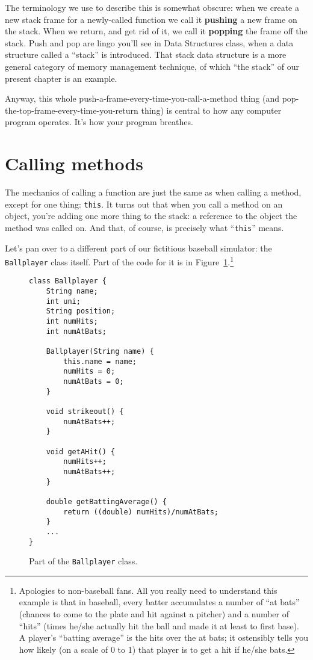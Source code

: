 The terminology we use to describe this is somewhat obscure: when we create a
new stack frame for a newly-called function we call it \textbf{pushing} a new
frame on the stack. When we return, and get rid of it, we call it
\textbf{popping} the frame off the stack. Push and pop are lingo you'll see in
Data Structures class, when a data structure called a ``stack'' is introduced.
That stack data structure is a more general category of memory management
technique, of which ``the stack'' of our present chapter is an example.

Anyway, this whole push-a-frame-every-time-you-call-a-method thing (and
pop-the-top-frame-every-time-you-return thing) is central to how any computer
program operates. It's how your program breathes.


\section{Calling methods}

The mechanics of calling a function are just the same as when calling a
method, except for one thing: \texttt{this}. It turns out that when you call a
method on an object, you're adding one more thing to the stack: a reference to
the object the method was called on. And that, of course, is precisely what
``\texttt{this}'' means.

Let's pan over to a different part of our fictitious baseball simulator: the
\texttt{Ballplayer} class itself. Part of the code for it is in
Figure~\ref{fig:BallplayerCode}.\footnote{Apologies to non-baseball fans. All
you really need to understand this example is that in baseball, every batter
accumulates a number of ``at bats'' (chances to come to the plate and hit
against a pitcher) and a number of ``hits'' (times he/she actually hit the ball
and made it at least to first base). A player's ``batting average'' is the hits
over the at bats; it ostensibly tells you how likely (on a scale of 0 to 1)
that player is to get a hit if he/she bats.}

\begin{figure}[ht]
\begin{Verbatim}[fontsize=\footnotesize,samepage=true,frame=single]
class Ballplayer {
    String name;
    int uni;
    String position;
    int numHits;
    int numAtBats;

    Ballplayer(String name) {
        this.name = name;
        numHits = 0;
        numAtBats = 0;
    }

    void strikeout() {
        numAtBats++;
    }

    void getAHit() {
        numHits++;
        numAtBats++;
    }

    double getBattingAverage() {
        return ((double) numHits)/numAtBats;
    }
    ...
}
\end{Verbatim}
\caption{Part of the \texttt{Ballplayer} class.}
\label{fig:BallplayerCode}
\end{figure}


